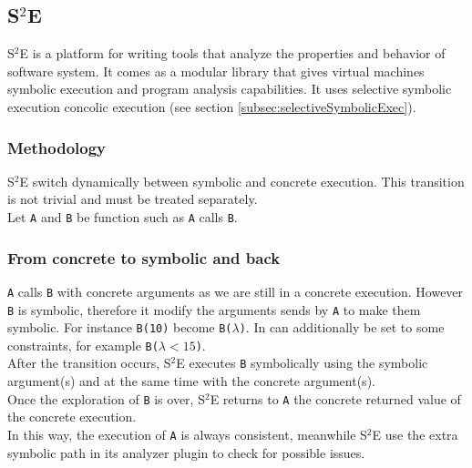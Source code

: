 \documentclass[11pt]{IEEEtran}
\begin{document}

	\subsection{S$^2$E}
    \label{subsec:S2E}
    	S$^2$E is a platform for writing tools that analyze the properties and behavior of software system. It comes as a modular library that gives virtual machines symbolic execution and program analysis capabilities.\cite{S2EWebSite} It uses selective symbolic execution concolic execution (see section  \ref{subsec:selectiveSymbolicExec}).



    	\subsubsection{Methodology}
    		S$^2$E switch dynamically between symbolic and concrete execution. This transition is not trivial and must be treated separately.\\
    		Let \texttt{A} and \texttt{B} be function such as \texttt{A} calls \texttt{B}.\\
    		\subsubsection*{From concrete to symbolic and back}
    			\texttt{A} calls \texttt{B} with concrete arguments as we are still in a concrete execution. However \texttt{B} is symbolic, therefore it modify the arguments sends by \texttt{A} to make them symbolic. For instance \texttt{B(10)} become \texttt{B($\lambda$)}. In can additionally be set to some constraints, for example \texttt{B($\lambda < 15$)}.\\
    			After the transition occurs, S$^2$E executes \texttt{B} symbolically using the symbolic argument(s) and at the same time with the concrete argument(s).\\
    			Once the exploration of \texttt{B} is over, S$^2$E returns to \texttt{A} the concrete returned value of the concrete execution.\\
    			In this way, the execution of \texttt{A} is always consistent, meanwhile S$^2$E use the extra symbolic path in its analyzer plugin to check for possible issues.
\end{document}
